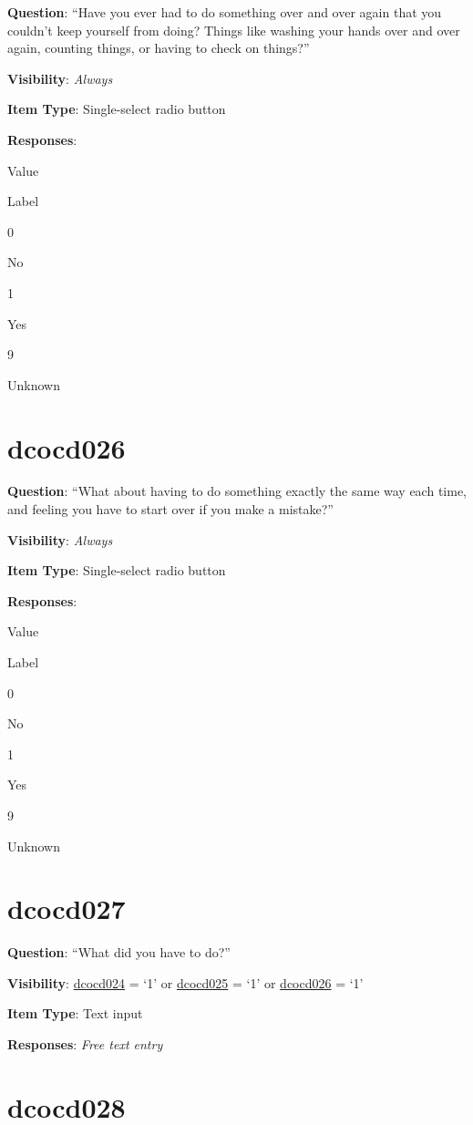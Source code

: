 \documentclass[]{book}
\begin{document}
\textbf{Question}: ``Have you ever had to do something over and over again that you couldn't keep yourself from doing? Things like washing your hands over and over again, counting things, or having to check on things?''

\textbf{Visibility}: \emph{Always}

\textbf{Item Type}: Single-select radio button

\textbf{Responses}:

Value

Label

0

No

1

Yes

9

Unknown

\hypertarget{dcocd026}{%
\section{dcocd026}\label{dcocd026}}

\textbf{Question}: ``What about having to do something exactly the same way each time, and feeling you have to start over if you make a mistake?''

\textbf{Visibility}: \emph{Always}

\textbf{Item Type}: Single-select radio button

\textbf{Responses}:

Value

Label

0

No

1

Yes

9

Unknown

\hypertarget{dcocd027}{%
\section{dcocd027}\label{dcocd027}}

\textbf{Question}: ``What did you have to do?''

\textbf{Visibility}: \protect\hyperlink{dcocd024}{dcocd024} = `1' or \protect\hyperlink{dcocd025}{dcocd025} = `1' or \protect\hyperlink{dcocd026}{dcocd026} = `1'

\textbf{Item Type}: Text input

\textbf{Responses}: \emph{Free text entry}

\hypertarget{dcocd028}{%
\section{dcocd028}\label{dcocd028}}
\end{document}
